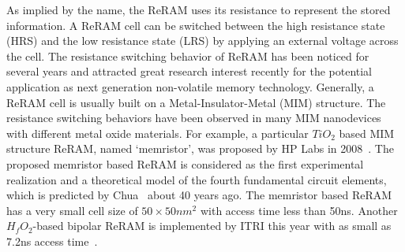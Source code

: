 As implied by the name, the ReRAM uses its resistance to represent the stored information. A ReRAM cell can be switched between the high resistance state (HRS) and the low resistance state (LRS) by applying an external voltage across the cell. The resistance switching behavior of ReRAM has been noticed for several years and attracted great research interest recently for the potential application as next generation non-volatile memory technology. Generally, a ReRAM cell is usually built on a Metal-Insulator-Metal (MIM) structure. The resistance switching behaviors have been observed in many MIM nanodevices with different metal oxide materials. For example, a particular $TiO_2$ based MIM structure ReRAM, named `memristor', was proposed by HP Labs in 2008~\cite{memristor:missing}. The proposed memristor based ReRAM is considered as the first experimental realization and a theoretical model of the fourth fundamental circuit elements, which is predicted by Chua~\cite{memristor:chua} about 40 years ago. The memristor based ReRAM has a very small cell size of $50\times50 nm^2$ with access time less than 50ns. Another $H_fO_2$-based bipolar ReRAM is implemented by ITRI this year with as small as 7.2ns access time~\cite{memristor:ISSCC2011_ITRI}.


